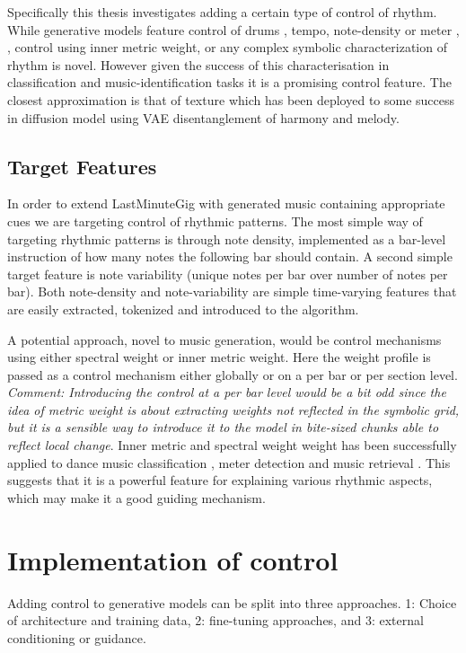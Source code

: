 Specifically this thesis investigates adding a certain type of control of rhythm. While generative models feature control of drums \cite{Lan_Hsiao_Cheng_Yang_musicongen_2024}, tempo, note-density or meter \cite{Rütte_figaro_2023}, \cite{Huang_Yang_remi_pop_transformer_2020}, control using inner metric weight, or any complex symbolic characterization of rhythm is novel. However given the success of this characterisation in classification and music-identification tasks it is a promising control feature. The closest approximation is that of texture \cite{Min_Jiang_Xia_Zhao_polyffusion_2023} which has been deployed to some success in diffusion model using VAE disentanglement of harmony and melody. 


\subsection{Target Features}
In order to extend LastMinuteGig with generated music containing appropriate cues we are targeting control of rhythmic patterns. The most simple way of targeting rhythmic patterns is through note density, implemented as a bar-level instruction of how many notes the following bar should contain. A second simple target feature is note variability (unique notes per bar over number of notes per bar). Both note-density and note-variability are simple time-varying features that are easily extracted, tokenized and introduced to the algorithm.  

A potential approach, novel to music generation, would be control mechanisms using either spectral weight or inner metric weight. Here the weight profile is passed as a control mechanism either globally or on a per bar or per section level. \textit{Comment: Introducing the control at a per bar level would be a bit odd since the idea of metric weight is about extracting weights not reflected in the symbolic grid, but it is a sensible way to introduce it to the model in bite-sized chunks able to reflect local change}. Inner metric and spectral weight weight has been successfully applied to dance music classification \cite{Chew_Volk_Lee_Dance_metric_weight_2005}, meter detection \cite{Haas_Volk_2016} and music retrieval \cite{Volk_Garbers_VanKranenburg_Wiering_Grijp_Veltkamp_2009}. This suggests that it is a powerful feature for explaining various rhythmic aspects, which may make it a good guiding mechanism. 

\section{Implementation of control} \label{section:addingcontrol}
Adding control to generative models can be split into three approaches. 1: Choice of architecture and training data, 2: fine-tuning approaches, and 3: external conditioning or guidance.

